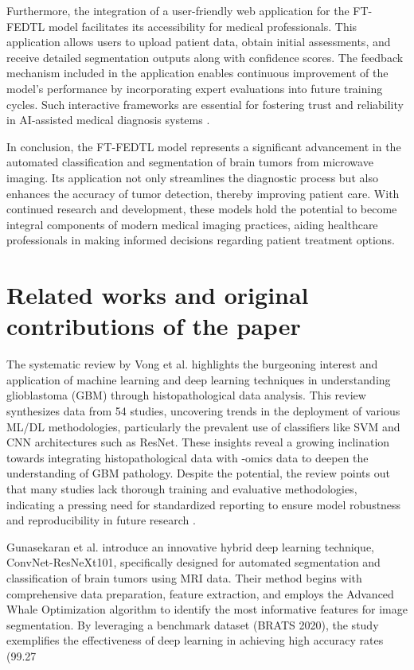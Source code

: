 \documentclass[runningheads]{llncs}
\begin{document}
Furthermore, the integration of a user-friendly web application for the FT-FEDTL model facilitates its accessibility for medical professionals. This application allows users to upload patient data, obtain initial assessments, and receive detailed segmentation outputs along with confidence scores. The feedback mechanism included in the application enables continuous improvement of the model's performance by incorporating expert evaluations into future training cycles. Such interactive frameworks are essential for fostering trust and reliability in AI-assisted medical diagnosis systems \cite{Kashfia_2023}.

In conclusion, the FT-FEDTL model represents a significant advancement in the automated classification and segmentation of brain tumors from microwave imaging. Its application not only streamlines the diagnostic process but also enhances the accuracy of tumor detection, thereby improving patient care. With continued research and development, these models hold the potential to become integral components of modern medical imaging practices, aiding healthcare professionals in making informed decisions regarding patient treatment options.
\section{Related works and original contributions of the paper}
The systematic review by Vong et al. highlights the burgeoning interest and application of machine learning and deep learning techniques in understanding glioblastoma (GBM) through histopathological data analysis. This review synthesizes data from 54 studies, uncovering trends in the deployment of various ML/DL methodologies, particularly the prevalent use of classifiers like SVM and CNN architectures such as ResNet. These insights reveal a growing inclination towards integrating histopathological data with -omics data to deepen the understanding of GBM pathology. Despite the potential, the review points out that many studies lack thorough training and evaluative methodologies, indicating a pressing need for standardized reporting to ensure model robustness and reproducibility in future research \cite{Chun_2025}.

Gunasekaran et al. introduce an innovative hybrid deep learning technique, ConvNet-ResNeXt101, specifically designed for automated segmentation and classification of brain tumors using MRI data. Their method begins with comprehensive data preparation, feature extraction, and employs the Advanced Whale Optimization algorithm to identify the most informative features for image segmentation. By leveraging a benchmark dataset (BRATS 2020), the study exemplifies the effectiveness of deep learning in achieving high accuracy rates (99.27%
\end{document}
